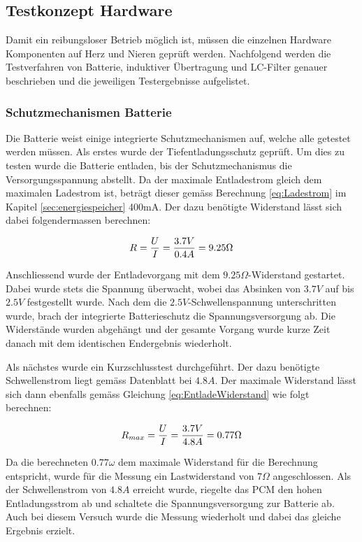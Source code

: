 \subsection{Testkonzept Hardware}\label{sec:testkonzeptHardware}
Damit ein reibungsloser Betrieb möglich ist, müssen die einzelnen Hardware Komponenten auf Herz und Nieren geprüft werden. Nachfolgend werden die Testverfahren von Batterie, induktiver Übertragung und LC-Filter genauer beschrieben und die jeweiligen Testergebnisse aufgelistet.

\subsubsection*{Schutzmechanismen Batterie}\label{sec:batterieSchutzVal}
Die Batterie weist einige integrierte Schutzmechanismen auf, welche alle getestet werden müssen. Als erstes wurde der Tiefentladungsschutz geprüft. Um dies zu testen wurde die Batterie entladen, bis der Schutzmechanismus die Versorgungsspannung abstellt. Da der maximale Entladestrom gleich dem maximalen Ladestrom ist, beträgt dieser gemäss Berechnung \ref{eq:Ladestrom} im Kapitel \ref{sec:energiespeicher} 400mA. Der dazu benötigte Widerstand lässt sich dabei folgendermassen berechnen:
 
\begin{equation}
\centering
R=\frac{U}{I}=\frac{3.7V}{0.4A}= 9.25\Omega
\label{eq:EntladeWiderstand}
\end{equation}

Anschliessend wurde der Entladevorgang mit dem $9.25\Omega$-Widerstand gestartet. Dabei wurde stets die Spannung überwacht, wobei das Absinken von $3.7V$ auf bis $2.5V$ festgestellt wurde. Nach dem die $2.5V$-Schwellenspannung unterschritten wurde, brach der integrierte Batterieschutz die Spannungsversorgung ab. Die Widerstände wurden abgehängt und der gesamte Vorgang wurde kurze Zeit danach mit dem identischen Endergebnis wiederholt.

Als nächstes wurde ein Kurzschlusstest durchgeführt. Der dazu benötigte Schwellenstrom liegt gemäss Datenblatt \cite{LIBattery} bei $4.8A$. Der maximale Widerstand lässt sich dann ebenfalls gemäss Gleichung \ref{eq:EntladeWiderstand} wie folgt berechnen:

\begin{equation}
\centering
R_{max}=\frac{U}{I}=\frac{3.7V}{4.8A}= 0.77\Omega
\label{eq:EntladeWiderstand1}
\end{equation}

Da die berechneten $0.77\omega$ dem maximale Widerstand für die Berechnung entspricht, wurde für die Messung ein Lastwiderstand von $7\Omega$ angeschlossen. Als der Schwellenstrom von $4.8A$ erreicht wurde, riegelte das PCM den hohen Entladungsstrom ab und schaltete die Spannungsversorgung zur Batterie ab. Auch bei diesem Versuch wurde die Messung wiederholt und dabei das gleiche Ergebnis erzielt.

